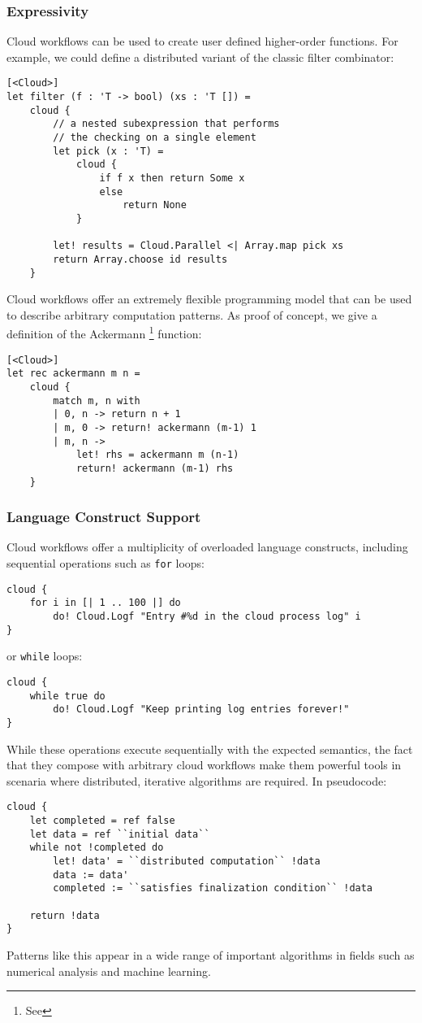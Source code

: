 \subsubsection*{Expressivity}
%
Cloud workflows can be used to create user defined higher-order functions. 
For example, we could define a distributed variant of the classic filter combinator:
\begin{lstlisting}
[<Cloud>]
let filter (f : 'T -> bool) (xs : 'T []) =
    cloud {
		// a nested subexpression that performs
		// the checking on a single element
		let pick (x : 'T) =
			cloud {
				if f x then return Some x
				else
					return None
			}

        let! results = Cloud.Parallel <| Array.map pick xs
		return Array.choose id results
    }
\end{lstlisting}
%
%
Cloud workflows offer an extremely flexible programming model that can
be used to describe arbitrary computation patterns.
As proof of concept, we give a definition of the Ackermann%
\footnote{See } function:
\begin{lstlisting}
[<Cloud>]
let rec ackermann m n =
    cloud {
        match m, n with
        | 0, n -> return n + 1
        | m, 0 -> return! ackermann (m-1) 1
        | m, n ->
            let! rhs = ackermann m (n-1)
            return! ackermann (m-1) rhs
    }
\end{lstlisting}
%
\subsubsection*{Language Construct Support}
%
Cloud workflows offer a multiplicity of overloaded language constructs,
including sequential operations such as \texttt{for} loops:
\begin{lstlisting}
cloud {
    for i in [| 1 .. 100 |] do
        do! Cloud.Logf "Entry #%d in the cloud process log" i
}
\end{lstlisting}
or \texttt{while} loops:
\begin{lstlisting}
cloud {
    while true do
        do! Cloud.Logf "Keep printing log entries forever!"
}
\end{lstlisting}
%
While these operations execute sequentially with the expected semantics,
the fact that they compose with arbitrary cloud workflows make them powerful
tools in scenaria where distributed, iterative algorithms are required.
In pseudocode:
\begin{lstlisting}
cloud {
    let completed = ref false
    let data = ref ``initial data``
    while not !completed do
        let! data' = ``distributed computation`` !data
        data := data'
        completed := ``satisfies finalization condition`` !data

    return !data
}
\end{lstlisting}
%
Patterns like this appear in a wide range of important algorithms in
fields such as numerical analysis and machine learning.

